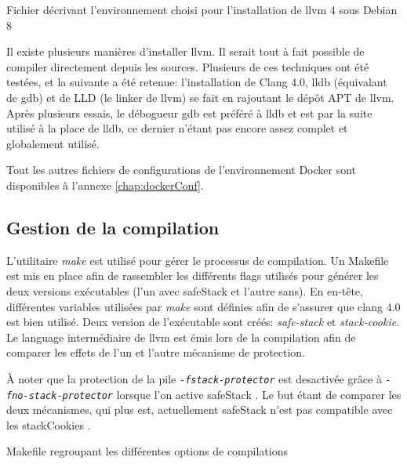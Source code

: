 \begin{listing}
	\caption{Fichier décrivant l'environnement choisi pour l'installation de \gls{llvm} 4 sous Debian 8}
	\label{lst:dockerfile}
\end{listing}

Il existe plusieurs manières d'installer \gls{llvm}. Il serait tout à fait possible de compiler directement depuis les sources. Plusieurs de ces techniques ont été testées, et la suivante a été retenue: l'installation de Clang 4.0, \gls{lldb} (équivalant de \gls{gdb}) et de LLD (le \og linker \fg de \gls{llvm}) se fait en rajoutant le dépôt APT de \gls{llvm}. Après plusieurs essais, le débogueur \gls{gdb} est préféré à \gls{lldb} et est par la suite utilisé à la place de \gls{lldb}, ce dernier n'étant pas encore assez complet et globalement utilisé.

Tout les autres fichiers de configurations de l'environnement Docker sont disponibles à l'annexe \ref{chap:dockerConf}.

\subsection{Gestion de la compilation}

L'utilitaire \textit{make} est utilisé pour gérer le processus de compilation. Un Makefile est mis en place afin de rassembler les différents \og flags \fg utilisés pour générer les deux versions exécutables (l'un avec \gls{safeStack} et l'autre sans). En en-tête, différentes variables utilisées par \textit{make} sont définies afin de s'assurer que \gls{clang} 4.0 est bien utilisé. Deux version de l'exécutable sont créés: \textit{safe-stack} et \textit{stack-cookie}. Le language intermédiaire de \gls{llvm} est émis lors de la compilation afin de comparer les effets de l'un et l'autre mécanisme de protection.

À noter que la protection de la pile \texttt{\textit{-fstack-protector}} est desactivée grâce à \texttt{\textit{-fno-stack-protector}} lorsque l'on active \og \gls{safeStack} \fg. Le but étant de comparer les deux mécanismes, qui plus est, actuellement \og \gls{safeStack} \fg n'est pas compatible avec les \og \gls{stackCookies} \fg.

\begin{listing}
	\caption{Makefile regroupant les différentes options de compilations}
	\label{lst:defaultMakefile}
\end{listing}

